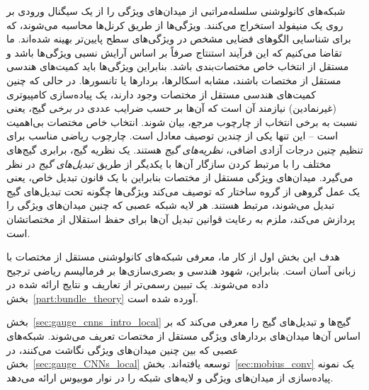 
\label{part:local_theory}

شبکه‌های کانولوشنی سلسله‌مراتبی از میدان‌های ویژگی را از یک سیگنال ورودی بر روی یک منیفولد استخراج می‌کنند.
ویژگی‌ها از طریق کرنل‌ها محاسبه می‌شوند، که برای شناسایی الگوهای فضایی مشخص در ویژگی‌های سطح پایین‌تر بهینه شده‌اند.
ما تقاضا می‌کنیم که این فرآیند استنتاج صرفاً بر اساس آرایش نسبی ویژگی‌ها باشد و مستقل از انتخاب خاص مختصات‌بندی باشد.
بنابراین ویژگی‌ها باید کمیت‌های هندسی مستقل از مختصات باشند، مشابه اسکالرها، بردارها یا تانسورها.
در حالی که چنین کمیت‌های هندسی مستقل از مختصات وجود دارند، یک پیاده‌سازی کامپیوتری (غیرنمادین) نیازمند آن است که آن‌ها بر حسب ضرایب عددی در \emph{برخی} گیج، یعنی نسبت به برخی انتخاب از چارچوب مرجع، بیان شوند.
انتخاب خاص مختصات بی‌اهمیت است -- این تنها یکی از چندین توصیف معادل است.
چارچوب ریاضی مناسب برای تنظیم چنین درجات آزادی اضافی، \emph{نظریه‌های گیج} هستند.
یک نظریه گیج، برابری گیج‌های مختلف را با مرتبط کردن سازگار آن‌ها با یکدیگر از طریق \emph{تبدیل‌های گیج} در نظر می‌گیرد.
میدان‌های ویژگی مستقل از مختصات بنابراین با یک قانون تبدیل خاص، یعنی یک عمل گروهی از گروه ساختار که توصیف می‌کند ویژگی‌ها چگونه تحت تبدیل‌های گیج تبدیل می‌شوند، مرتبط هستند.
هر لایه شبکه عصبی که چنین میدان‌های ویژگی را پردازش می‌کند، ملزم به رعایت قوانین تبدیل آن‌ها برای حفظ استقلال از مختصاتشان است.

هدف این بخش اول از کار ما، معرفی شبکه‌های کانولوشنی مستقل از مختصات با زبانی آسان است.
بنابراین، شهود هندسی و بصری‌سازی‌ها بر فرمالیسم ریاضی ترجیح داده می‌شوند.
یک تبیین رسمی‌تر از تعاریف و نتایج ارائه شده در بخش~\ref{part:bundle_theory} آورده شده است.

\etocsettocstyle{}{} %
\localtableofcontents

\vspace*{2.ex}

بخش~\ref{sec:gauge_cnns_intro_local} گیج‌ها و تبدیل‌های گیج را معرفی می‌کند که بر اساس آن‌ها میدان‌های بردارهای ویژگی مستقل از مختصات تعریف می‌شوند.
شبکه‌های عصبی که بین چنین میدان‌های ویژگی نگاشت می‌کنند، در بخش~\ref{sec:gauge_CNNs_local} توسعه یافته‌اند.
بخش~\ref{sec:mobius_conv} یک نمونه پیاده‌سازی از میدان‌های ویژگی و لایه‌های شبکه را در نوار موبیوس ارائه می‌دهد.